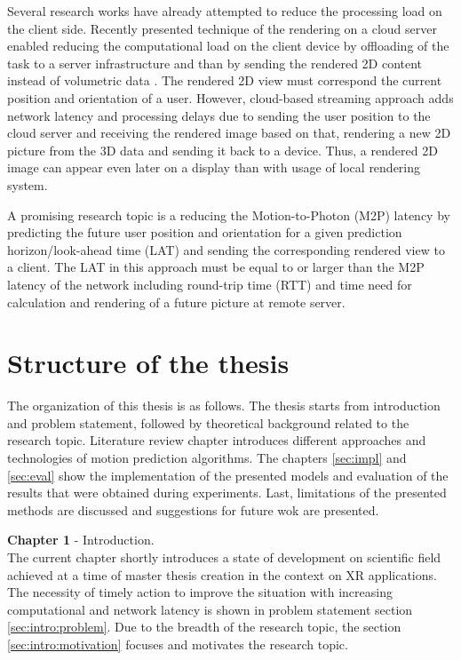 Several research works have already attempted to reduce the processing load on the client side. Recently presented technique of the rendering on a cloud server enabled reducing the computational load on the client device by offloading of the task to a server infrastructure and than by sending the rendered 2D content instead of volumetric data \cite{serhan_cloud_streaming}. The rendered 2D view must correspond the current position and orientation of a user. However, cloud-based streaming approach adds network latency and processing delays due to sending the user position to the cloud server and receiving the rendered image based on that, rendering a new 2D picture from the 3D data and sending it back to a device. Thus, a rendered 2D image can appear even later on a display than with usage of local rendering system.

A promising research topic is a reducing the Motion-to-Photon (M2P) latency by predicting the future user position and orientation for a given prediction horizon/look-ahead time (LAT) and sending the corresponding rendered view to a client. The LAT in this approach must be equal to or larger than the M2P latency of the network including round-trip time (RTT) and time need for calculation and rendering of a future picture at remote server.

\section{Structure of the thesis}
\label{sec:intro:structure}
The organization of this thesis is as follows. The thesis starts from introduction and problem statement, followed by theoretical background related to the research topic. Literature review chapter introduces different approaches and technologies of motion prediction algorithms. The chapters \ref{sec:impl} and \ref{sec:eval} show the implementation of the presented models and evaluation of the results that were obtained during experiments. Last, limitations of the presented methods are discussed and suggestions for future wok are presented.

\textbf{Chapter 1} - Introduction.\\
The current chapter shortly introduces a state of development on scientific field achieved at a time of master thesis creation in the context on XR applications. The necessity of timely action to improve the situation with increasing computational and network latency is shown in problem statement section \ref{sec:intro:problem}. Due to the breadth of the research topic, the section \ref{sec:intro:motivation} focuses and motivates the research topic. 

